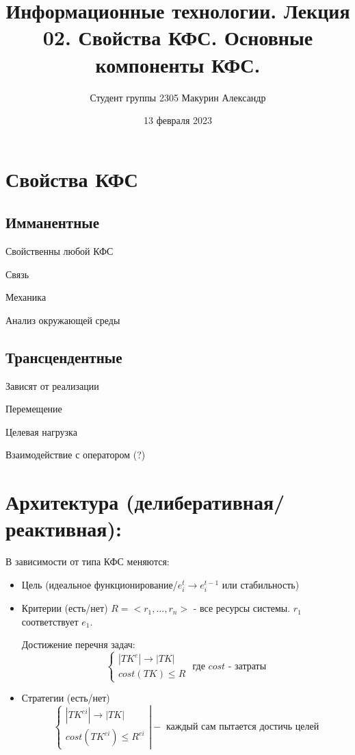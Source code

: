 \documentclass{article}
\title{Информационные технологии. Лекция 02. Свойства КФС. Основные компоненты КФС.}
\author{Студент группы 2305 Макурин Александр}
\date{13 февраля 2023}
\begin{document}
\maketitle
\begin{sloppypar}

    \section{Свойства КФС}
    \subsection{Имманентные}
    Свойственны любой КФС

    Связь

    Механика

    Анализ окружающей среды

    \subsection{Трансцендентные}
    Зависят от реализации

    Перемещение

    Целевая нагрузка

    Взаимодействие с оператором (?)

    \section{Архитектура (делиберативная/реактивная):}
    В зависимости от типа КФС меняются:
    \begin{itemize}
        \item Цель (идеальное функционирование/$e_i^t \rightarrow e_i^{t - 1}$ или стабильность)
        \item Критерии (есть/нет)
              $R = <r_1, ..., r_n>$ - все ресурсы системы. $r_1$ соответствует $e_1$.

              Достижение перечня задач:
              \[
                  \left\{\begin{array}{ll}
                      |TK^e| \rightarrow |TK| \\
                      cost(TK) \leq R
                  \end{array}\right.
                  \text{ где $cost$ - затраты}
              \]
        \item Стратегии (есть/нет)
              \[
                  \left\{\begin{array}{ll}
                      |TK^{ei}| \rightarrow |TK| \\
                      cost(TK^{ei}) \leq R^{ei}
                  \end{array}\right|
                  - \text{ каждый сам пытается достичь целей}
              \]


\end{itemize}
\end{sloppypar}
\end{document}
